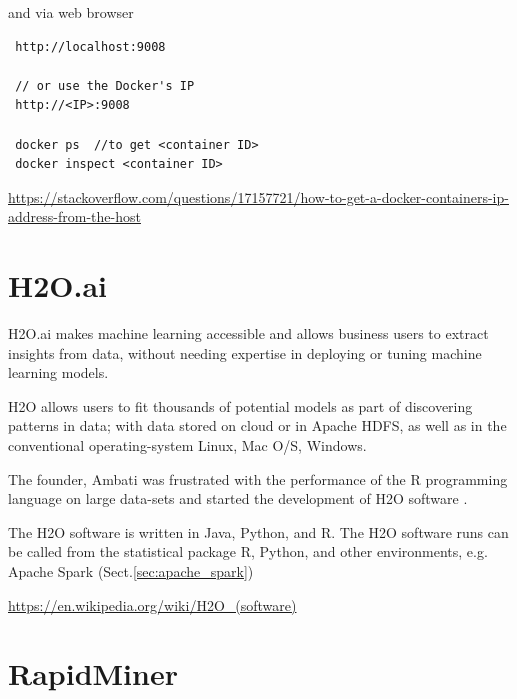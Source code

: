 and via web browser
\begin{verbatim}
 http://localhost:9008
 
 // or use the Docker's IP
 http://<IP>:9008
  
 docker ps  //to get <container ID>
 docker inspect <container ID>
\end{verbatim}
\url{https://stackoverflow.com/questions/17157721/how-to-get-a-docker-containers-ip-address-from-the-host}


\section{H2O.ai}
\label{sec:H2O.ai}

H2O.ai makes machine learning accessible and allows business users to extract
insights from data, without needing expertise in deploying or tuning machine
learning models.

H2O allows users to fit thousands of potential models as part of discovering
patterns in data; with data stored on cloud or in Apache HDFS, as well as in the
conventional operating-system Linux, Mac O/S, Windows.

The founder, Ambati was frustrated with the performance of the R programming
language on large data-sets and started the development of H2O software .

The H2O software is written in Java, Python, and R. The H2O software runs can be
called from the statistical package R, Python, and other environments, e.g. 
Apache Spark (Sect.\ref{sec:apache_spark})

\url{https://en.wikipedia.org/wiki/H2O_(software)}





\section{RapidMiner}
\label{sec:RapidMiner}
